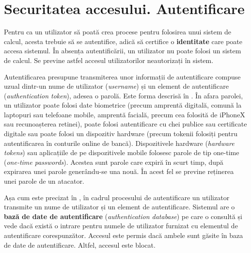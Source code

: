 
\section{Securitatea accesului. Autentificare}
\label{sec:sec:auth}

Pentru ca un utilizator să poată crea procese pentru folosirea unui sistem de calcul, acesta trebuie să se autentifice, adică să certifice o \textbf{identitate} care poate accesa sistemul. În absența autentificării, un utilizator nu poate folosi un sistem de calcul. Se previne astfel accesul utilizatorilor neautorizați în sistem.

Autentificarea presupune transmiterea unor informații de autentificare compuse uzual dintr-un nume de utilizator (\textit{username}) și un element de autentificare (\textit{authentication token}), adesea o parolă. Este forma descrisă în . În afara parolei, un utilizator poate folosi date biometrice (precum amprentă digitală, comună la laptopuri sau telefoane mobile, amprentă facială, precum cea folosită de iPhoneX sau recunoașterea retinei), poate folosi autentificare cu chei publice sau certificate digitale sau poate folosi un dispozitiv hardware (precum tokenii folosiți pentru autentificarea în conturile online de bancă). Dispozitivele hardware (\textit{hardware tokens}) sau aplicațiile de pe dispozitivele mobile folosesc parole de tip one-time (\textit{one-time passwords}). Acestea sunt parole care expiră în scurt timp, după expirarea unei parole generându-se una nouă. În acest fel se previne reținerea unei parole de un atacator.

Așa cum este precizat în , în cadrul procesului de autentificare un utilizator transmite un nume de utilizator și un element de autentificare. Sistemul are o \textbf{bază de date de autentificare} (\textit{authentication database}) pe care o consultă și vede dacă există o intrare pentru numele de utilizator furnizat cu elementul de autentificare corespunzător. Accesul este permis dacă ambele sunt găsite în baza de date de autentificare. Altfel, accesul este blocat.

